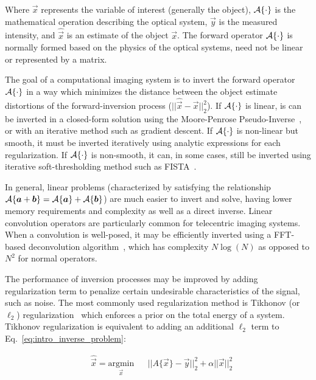 Where $\vec{x}$ represents the variable of interest (generally the object), $\mathcal{A}\{\cdot\}$ is the mathematical operation describing the optical system, $\vec{y}$ is the measured intensity, and $\hat{\vec{x}}$ is an estimate of the object $\vec{x}$. The forward operator $\mathcal{A}\{\cdot\}$ is normally formed based on the physics of the optical systems, need not be linear or represented by a matrix.

The goal of a computational imaging system is to invert the forward operator $\mathcal{A}\{\cdot\}$ in a way which minimizes the distance between the object estimate distortions of the forward-inversion process ($||\hat{\vec{x}} - \vec{x}||_2^2$). If $\mathcal{A}\{\cdot\}$ is linear, is can be inverted in a closed-form solution using the Moore-Penrose Pseudo-Inverse~\cite{moore1920reciprocal}, or with an iterative method such as gradient descent. If $\mathcal{A}\{\cdot\}$ is non-linear but smooth, it must be inverted iteratively using analytic expressions for each regularization. If $\mathcal{A}\{\cdot\}$ is non-smooth, it can, in some cases, still be inverted using iterative soft-thresholding method such as FISTA~\cite{beck2009fast}.

In general, linear problems (characterized by satisfying the relationship $\mathcal{A}\{\bm{a} + \bm{b}\} = \mathcal{A}\{\bm{a}\} + \mathcal{A}\{\bm{b}\} $) are much easier to invert and solve, having lower memory requirements and complexity as well as a direct inverse. Linear convolution operators are particularly common for telecentric imaging systems. When a convolution is well-posed, it may be efficiently inverted using a FFT-based deconvolution algorithm~\cite{cooley1965algorithm}, which has complexity $N \log(N)$ as opposed to $N^2$ for normal operators.

The performance of inversion processes may be improved by adding regularization term to penalize certain undesirable characteristics of the signal, such as noise. The most commonly used regularization method is Tikhonov (or $\ell_2$) regularization~\cite{tikhonov1943stability} which enforces a prior on the total energy of a system. Tikhonov regularization is equivalent to adding an additional $\ell_2$ term to Eq.~\ref{eq:intro_inverse_problem}:

\begin{equation}\label{eq:intro_tikhonov}
\begin{aligned}
& \hat{\vec{x}} = \underset{\vec{x}}{\text{argmin}}
& & ||A\{\vec{x}\}-\vec{y} ||_2^2 + \alpha||\vec{x}||_2^2
\end{aligned}
\end{equation}

